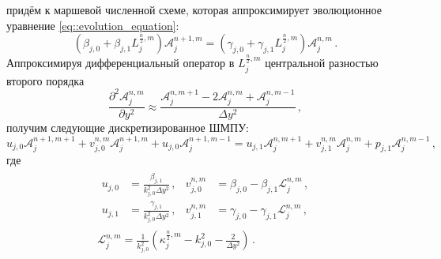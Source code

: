 \documentclass{fefu}
\newcommand{\pa}[1]{\left(#1\right)}
\begin{document}
                придём к маршевой численной схеме, которая аппроксимирует эволюционное уравнение \eqref{eq::evolution_equation}:
                \begin{equation}
                    \pa{\beta_{j,0}+\beta_{j,1}L_j^{\frac{n}{2},m}}\mathcal{A}_j^{n+1,m}=\pa{\gamma_{j,0}+\gamma_{j,1}L_j^{\frac{n}{2},m}}\mathcal{A}_j^{n,m}\,.
                \end{equation}
                Аппроксимируя дифференциальный оператор в $L_j^{\frac{n}{2},m}$ центральной разностью второго порядка
                \begin{equation}
                    \frac{\partial^2\mathcal{A}_j^{n,m}}{\partial y^2}\approx\frac{\mathcal{A}_j^{n,m+1}-2\mathcal{A}_j^{n,m}+\mathcal{A}_j^{n,m-1}}{\Delta y^2}\,,
                \end{equation}
                получим следующие дискретизированное ШМПУ:
                \begin{equation}
                    u_{j,0}\mathcal{A}_j^{n+1,m+1}+v_{j,0}^{n,m}\mathcal{A}_j^{n+1,m}+u_{j,0}\mathcal{A}_j^{n+1,m-1}=
                    u_{j,1}\mathcal{A}_j^{n,m+1}+v_{j,1}^{n,m}\mathcal{A}_j^{n,m}+p_{j,1}\mathcal{A}_j^{n,m-1}\,,
                \end{equation}
                где
                \begin{gather}
                    \begin{aligned}
                        u_{j,0}&=\frac{\beta_{j,1}}{k_{j,0}^2\Delta y^2}\,,&v_{j,0}^{n,m}&=\beta_{j,0}-\beta_{j,1}\mathcal{L}_j^{n,m}\,,\\
                        u_{j,1}&=\frac{\gamma_{j,1}}{k_{j,0}^2\Delta y^2}\,,&v_{j,1}^{n,m}&=\gamma_{j,0}-\gamma_{j,1}\mathcal{L}_j^{n,m}\,,
                    \end{aligned}\\
                    \mathcal{L}_{j}^{n,m}=\frac{1}{k_{j,0}^2}\pa{\kappa_j^{\frac{n}{2},m}-k_{j,0}^2-\frac{2}{\Delta y^2}}\,.
                \end{gather}
\end{document}
